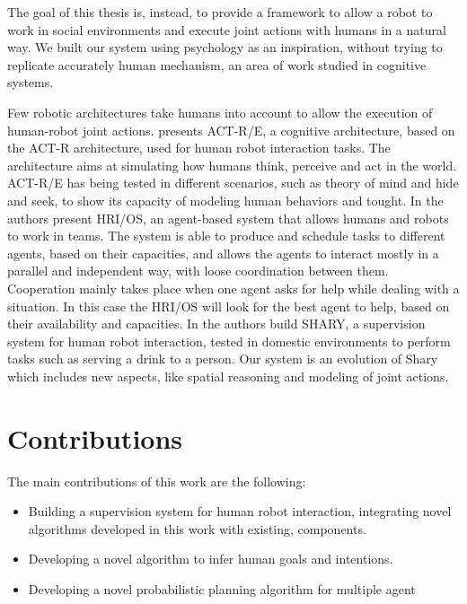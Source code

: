 The goal of this thesis is, instead, to provide a framework to allow a robot to work in social environments and execute joint actions with humans in a natural way. We built our system using psychology as an inspiration, without trying to replicate accurately human mechanism, an area of work studied in cognitive systems. 

Few robotic architectures take humans into
account to allow the execution of human-robot joint actions.
\cite{trafton2013act} presents ACT-R/E, a cognitive architecture, based
on the ACT-R architecture, used for human robot interaction tasks. The
architecture aims at simulating how humans think, perceive and act in
the world. ACT-R/E has being tested in different scenarios, such as
theory of mind and hide and seek, to show its capacity of modeling
human behaviors and tought.
In \cite{Fong_2006} the authors present  HRI/OS, an agent-based system
that allows humans and robots to work in teams. The system is able to
produce and schedule tasks to different agents, based on their capacities,
and allows the agents to interact mostly in a parallel and independent way, with
loose coordination between them. Cooperation  mainly
takes place when one agent asks for help while
dealing with a situation. In this case the HRI/OS will
look for the best agent to help, based on their availability and capacities.
In \cite{clodic2009shary} the authors build SHARY, a supervision
system for human robot interaction, tested in domestic environments to
perform tasks such as serving a drink to a person. Our system is an
evolution of Shary which includes new aspects, like spatial
reasoning and modeling of joint actions.


\section{Contributions}

The main contributions of this work are the following:
\begin{itemize}
\item Building a supervision system for human robot interaction, integrating novel algorithms developed in this work with existing, components.
\item Developing a novel algorithm to infer human goals and intentions.
\item Developing a novel probabilistic planning algorithm for multiple agent    
\end{itemize}

